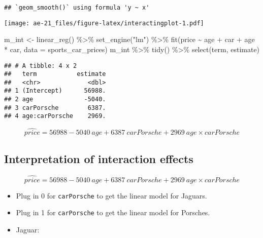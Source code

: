 \documentclass[
]{article}
\newenvironment{Shaded}{\begin{snugshade}}{\end{snugshade}}
\newcommand{\AttributeTok}[1]{\textcolor[rgb]{0.77,0.63,0.00}{#1}}
\newcommand{\FunctionTok}[1]{\textcolor[rgb]{0.00,0.00,0.00}{#1}}
\newcommand{\NormalTok}[1]{#1}
\newcommand{\OtherTok}[1]{\textcolor[rgb]{0.56,0.35,0.01}{#1}}
\newcommand{\SpecialCharTok}[1]{\textcolor[rgb]{0.00,0.00,0.00}{#1}}
\newcommand{\StringTok}[1]{\textcolor[rgb]{0.31,0.60,0.02}{#1}}
\begin{document}
\begin{verbatim}
## `geom_smooth()` using formula 'y ~ x'
\end{verbatim}

\texttt{[image: ae-21\_files/figure-latex/interactingplot-1.pdf]}

\begin{Shaded}
\begin{Highlighting}[]
\NormalTok{ m\_int }\OtherTok{\textless{}{-}} \FunctionTok{linear\_reg}\NormalTok{() }\SpecialCharTok{\%\textgreater{}\%}
  \FunctionTok{set\_engine}\NormalTok{(}\StringTok{"lm"}\NormalTok{) }\SpecialCharTok{\%\textgreater{}\%}
  \FunctionTok{fit}\NormalTok{(price }\SpecialCharTok{\textasciitilde{}}\NormalTok{ age }\SpecialCharTok{+}\NormalTok{ car }\SpecialCharTok{+}\NormalTok{ age }\SpecialCharTok{*}\NormalTok{ car, }
            \AttributeTok{data =}\NormalTok{ sports\_car\_prices) }
\NormalTok{m\_int }\SpecialCharTok{\%\textgreater{}\%}
  \FunctionTok{tidy}\NormalTok{() }\SpecialCharTok{\%\textgreater{}\%}
  \FunctionTok{select}\NormalTok{(term, estimate)}
\end{Highlighting}
\end{Shaded}

\begin{verbatim}
## # A tibble: 4 x 2
##   term           estimate
##   <chr>             <dbl>
## 1 (Intercept)      56988.
## 2 age              -5040.
## 3 carPorsche        6387.
## 4 age:carPorsche    2969.
\end{verbatim}

\[\widehat{price} = 56988 - 5040~age + 6387~carPorsche + 2969~age \times carPorsche\]

\hypertarget{interpretation-of-interaction-effects}{%
\subsection{Interpretation of interaction
effects}\label{interpretation-of-interaction-effects}}

\[\widehat{price} = 56988 - 5040~age + 6387~carPorsche + 2969~age \times carPorsche\]

\begin{itemize}
\item
  Plug in 0 for \texttt{carPorsche} to get the linear model for Jaguars.
\item
  Plug in 1 for \texttt{carPorsche} to get the linear model for
  Porsches.
\item
  Jaguar:
\end{itemize}
\end{document}
